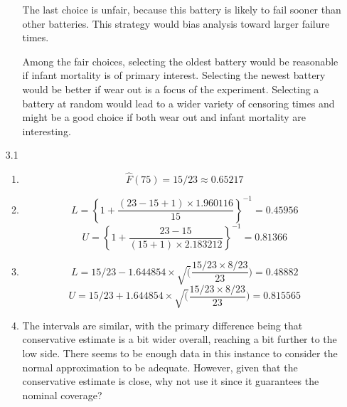 \documentclass[12pt]{article}\usepackage[]{graphicx}\usepackage[]{color}
\begin{document}
\begin{enumerate}
\begin{enumerate}
  The last choice is unfair, because this battery is likely to fail sooner than other batteries. This strategy would bias analysis toward larger failure times.
  
Among the fair choices, selecting the oldest battery would be reasonable if infant mortality is of primary interest. Selecting the newest battery would be better if wear out is a focus of the experiment. Selecting a battery at random would lead to a wider variety of censoring times and might be a good choice if both wear out and infant mortality are interesting.
\end{enumerate}

\item[3.1]
\begin{enumerate}

  \item
  \[\hat{F}(75) = 15/23 \approx 0.65217\]
  \item
  \[L = \left\{1 + \frac{(23-15+1)\times 1.960116}{15}\right\}^{-1}=0.45956\]
  \[U = \left\{1 + \frac{23-15}{(15+1)\times 2.183212}\right\}^{-1}=0.81366\]
  \item
  \[L = 15/23 - 1.644854 \times \sqrt(\frac{15/23 \times 8/23}{23}) = 0.48882\]
  \[U = 15/23 + 1.644854 \times \sqrt(\frac{15/23 \times 8/23}{23}) = 0.815565\]
  \item
  The intervals are similar, with the primary difference being that conservative estimate is a bit wider overall, reaching a bit further to the low side. There seems to be enough data in this instance to consider the normal approximation to be adequate. However, given that the conservative estimate is close, why not use it since it guarantees the nominal coverage?
\end{enumerate}
\end{enumerate}
\end{document}
